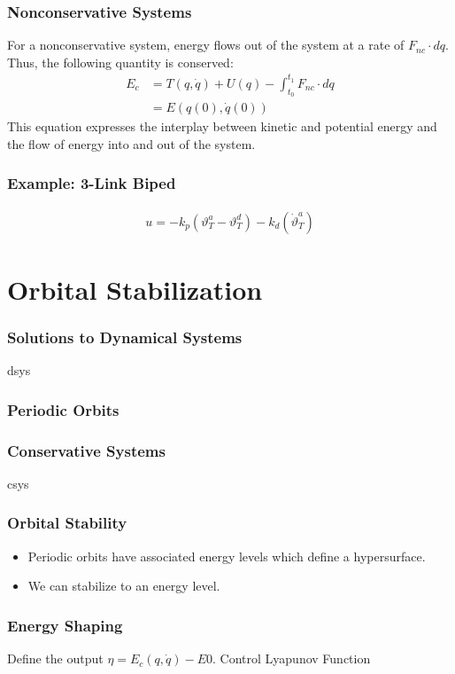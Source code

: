 \documentclass{beamer}
\newcommand{\nc}{\mathit{nc}}
\begin{document}
\begin{frame}
  \frametitle{Nonconservative Systems}
  For a nonconservative system, energy flows out of the system at a rate of $F_{\nc} \cdot dq$. Thus, the following quantity is conserved:
  \begin{align*}
    E_{c} &= T(q, \dot q) + U(q) - \int_{t_{0}}^{t_{1}} \! F_{\nc} \cdot dq\\
    &= E(q(0), \dot q(0))
  \end{align*}
  This equation expresses the interplay between kinetic and potential energy and the flow of energy into and out of the system.
\end{frame}

\begin{frame}
  \frametitle{Example: 3-Link Biped}
  \begin{align*}
    u = -k_{p} (\vartheta_{T}^{a} - \vartheta_{T}^{d}) - k_{d} (\dot \vartheta_{T}^{a})
  \end{align*}
\end{frame}

\section{Orbital Stabilization}
\begin{frame}
  \frametitle{Solutions to Dynamical Systems}
  dsys
\end{frame}

\begin{frame}
  \frametitle{Periodic Orbits}
\end{frame}

\begin{frame}
  \frametitle{Conservative Systems}
  csys
\end{frame}

\begin{frame}
  \frametitle{Orbital Stability}
  \begin{itemize}
  \item Periodic orbits have associated energy levels which define a hypersurface.
  \item We can stabilize to an energy level.
  \end{itemize}
\end{frame}


\begin{frame}
  \frametitle{Energy Shaping}
  Define the output $\eta = E_{c}(q, \dot q) - E0$.
  Control Lyapunov Function
\end{frame}
\end{document}
